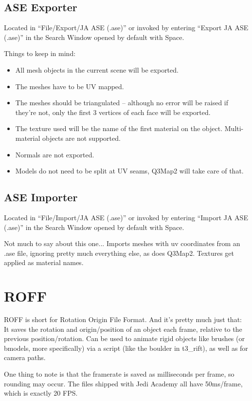 \documentclass[a4paper,10pt]{article}
\begin{document}
 \subsection{ASE Exporter}
 
 Located in ``File/Export/JA ASE (.ase)'' or invoked by entering ``Export JA ASE (.ase)'' in the Search Window
 opened by default with Space.
 
 Things to keep in mind:
 \begin{itemize}
  \item All mesh objects in the current scene will be exported.
  \item The meshes have to be UV mapped.
  \item The meshes should be triangulated -- although no error will be raised if they're not, only the first
  3 vertices of each face will be exported.
  \item The texture used will be the name of the first material on the object. Multi-material objects are not
  supported.
  \item Normals are not exported.
  \item Models do not need to be split at UV seams, Q3Map2 will take care of that.
 \end{itemize}
 
 \subsection{ASE Importer}
 
 Located in ``File/Import/JA ASE (.ase)'' or invoked by entering ``Import JA ASE (.ase)'' in the Search Window
 opened by default with Space.
 
 Not much to say about this one... Imports meshes with uv coordinates from an .ase file, ignoring pretty much
 everything else, as does Q3Map2. Textures get applied as material names.
 
 \section{ROFF}
 
 ROFF is short for Rotation Origin File Format. And it's pretty much just that: It saves the rotation and
 origin/position of an object each frame, relative to the previous position/rotation. Can be used to animate
 rigid objects like brushes (or bmodels, more specifically) via a script (like the boulder in t3\_rift), as
 well as for camera paths.
 
 One thing to note is that the framerate is saved as milliseconds per frame, so rounding may occur. The
 files shipped with Jedi Academy all have 50ms/frame, which is exactly 20 FPS.
 
\end{document}
